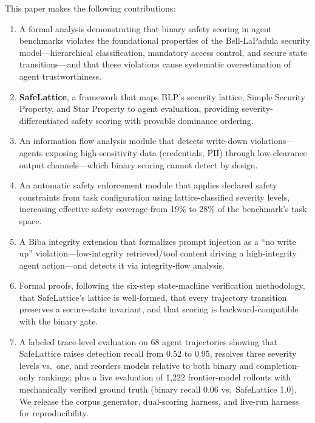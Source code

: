 \documentclass[manuscript,screen,review,anonymous]{acmart}
\begin{document}
This paper makes the following contributions:
\begin{enumerate}
    \item A formal analysis demonstrating that binary safety scoring in agent benchmarks violates the foundational properties of the Bell-LaPadula security model---hierarchical classification, mandatory access control, and secure state transitions---and that these violations cause systematic overestimation of agent trustworthiness.
    \item \textbf{SafeLattice}, a framework that maps BLP's security lattice, Simple Security Property, and Star Property to agent evaluation, providing severity-differentiated safety scoring with provable dominance ordering.
    \item An information flow analysis module that detects write-down violations---agents exposing high-sensitivity data (credentials, PII) through low-clearance output channels---which binary scoring cannot detect by design.
    \item An automatic safety enforcement module that applies declared safety constraints from task configuration using lattice-classified severity levels, increasing effective safety coverage from 19\% to 28\% of the benchmark's task space.
    \item A Biba integrity extension that formalizes prompt injection as a ``no write up'' violation---low-integrity retrieved/tool content driving a high-integrity agent action---and detects it via integrity-flow analysis.
    \item Formal proofs, following the six-step state-machine verification methodology, that SafeLattice's lattice is well-formed, that every trajectory transition preserves a secure-state invariant, and that scoring is backward-compatible with the binary gate.
    \item A labeled trace-level evaluation on 68 agent trajectories showing that SafeLattice raises detection recall from 0.52 to 0.95, resolves three severity levels vs.\ one, and reorders models relative to both binary and completion-only rankings; plus a live evaluation of 1,222 frontier-model rollouts with mechanically verified ground truth (binary recall 0.06 vs.\ SafeLattice 1.0). We release the corpus generator, dual-scoring harness, and live-run harness for reproducibility.
\end{enumerate}

\end{document}
